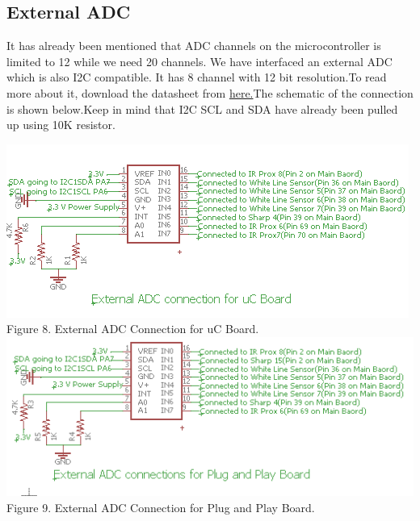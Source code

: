 \documentclass[a4paper,10pt,oneside]{article}
\begin{document}
{	\subsection{\textbf{External ADC}}
	{It has already been mentioned that ADC channels on the microcontroller is limited to 12 while we need 20 channels. We have interfaced an external ADC which is also I2C compatible. It has 8 channel with 12 bit resolution.To read more about it, download the datasheet from \href{www.ti.com/lit/pdf/snas483}{here.}The schematic of the connection is shown below.Keep in mind that I2C SCL and SDA have already been pulled up using 10K resistor.\\}
		\begin{center}
		\includegraphics{Images/externaladcuC}\\
		Figure 8. External ADC Connection for uC Board.
		\includegraphics{Images/externalADCplug}\\
		Figure 9. External ADC Connection for Plug and Play Board.
	\end{center}
}
\end{document}
